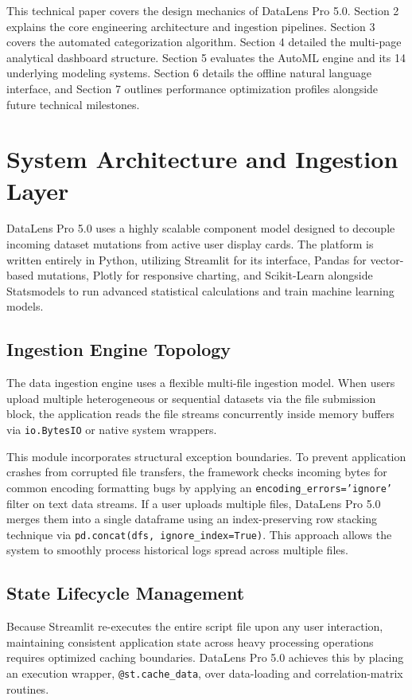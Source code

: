\documentclass[11pt,a4paper,titlepage]{article}
\begin{document}
This technical paper covers the design mechanics of DataLens Pro 5.0. Section 2 explains the core engineering architecture and ingestion pipelines. Section 3 covers the automated categorization algorithm. Section 4 detailed the multi-page analytical dashboard structure. Section 5 evaluates the AutoML engine and its 14 underlying modeling systems. Section 6 details the offline natural language interface, and Section 7 outlines performance optimization profiles alongside future technical milestones.


\section{System Architecture and Ingestion Layer}
DataLens Pro 5.0 uses a highly scalable component model designed to decouple incoming dataset mutations from active user display cards. The platform is written entirely in Python, utilizing Streamlit for its interface, Pandas for vector-based mutations, Plotly for responsive charting, and Scikit-Learn alongside Statsmodels to run advanced statistical calculations and train machine learning models.

\subsection{Ingestion Engine Topology}
The data ingestion engine uses a flexible multi-file ingestion model. When users upload multiple heterogeneous or sequential datasets via the file submission block, the application reads the file streams concurrently inside memory buffers via \texttt{io.BytesIO} or native system wrappers. 

This module incorporates structural exception boundaries. To prevent application crashes from corrupted file transfers, the framework checks incoming bytes for common encoding formatting bugs by applying an \texttt{encoding\_errors='ignore'} filter on text data streams. If a user uploads multiple files, DataLens Pro 5.0 merges them into a single dataframe using an index-preserving row stacking technique via \texttt{pd.concat(dfs, ignore\_index=True)}. This approach allows the system to smoothly process historical logs spread across multiple files.

\subsection{State Lifecycle Management}
Because Streamlit re-executes the entire script file upon any user interaction, maintaining consistent application state across heavy processing operations requires optimized caching boundaries. DataLens Pro 5.0 achieves this by placing an execution wrapper, \texttt{@st.cache\_data}, over data-loading and correlation-matrix routines. 
\end{document}
